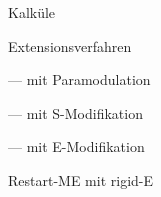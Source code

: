 \begin{Slide}
  \large\bf

  \SPACE
  Kalk\"ule
  \SPACE
  \begin{Itemize}[.8\textwidth]
    \item Extensionsverfahren
    \item --- mit Paramodulation
    \item --- mit S-Modifikation
    \item --- mit E-Modifikation
    \item Restart-ME mit rigid-E
  \end{Itemize}

  \SPACE
\end{Slide}



